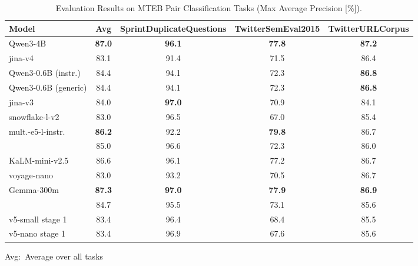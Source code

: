 \documentclass[11pt]{article}
\begin{document}
\begin{table}[H]
\caption{Evaluation Results on MTEB Pair Classification Tasks (Max Average Precision [\%]).}
\label{tab:mteb_pair_classification_en}
\centering
\small
\setlength{\tabcolsep}{4pt}
\begin{tabular}{l*{4}{c}}
\toprule
\textbf{Model} & \textbf{Avg} & \textbf{SprintDuplicateQuestions} & \textbf{TwitterSemEval2015} & \textbf{TwitterURLCorpus} \\
\midrule
Qwen3-4B & \textbf{87.0} & \textbf{96.1} & \textbf{77.8} & \textbf{87.2} \\
jina-v4 & 83.1 & 91.4 & 71.5 & 86.4 \\
\midrule
Qwen3-0.6B (instr.) & 84.4 & 94.1 & 72.3 & \textbf{86.8} \\
Qwen3-0.6B (generic) & 84.4 & 94.1 & 72.3 & \textbf{86.8} \\
jina-v3 & 84.0 & \textbf{97.0} & 70.9 & 84.1 \\
snowflake-l-v2 & 83.0 & 96.5 & 67.0 & 85.4 \\
mult.-e5-l-instr. & \textbf{86.2} & 92.2 & \textbf{79.8} & 86.7 \\
\JEmbeddingVFiveTextSmallShort{} & 85.0 & 96.6 & 72.3 & 86.0 \\
\midrule
KaLM-mini-v2.5 & 86.6 & 96.1 & 77.2 & 86.7 \\
voyage-nano & 83.0 & 93.2 & 70.5 & 86.7 \\
Gemma-300m & \textbf{87.3} & \textbf{97.0} & \textbf{77.9} & \textbf{86.9} \\
\JEmbeddingVFiveTextNanoShort{} & 84.7 & 95.5 & 73.1 & 85.6 \\
\midrule
v5-small stage 1 & 83.4 & 96.4 & 68.4 & 85.5 \\
v5-nano stage 1 & 83.4 & 96.9 & 67.6 & 85.6 \\
\bottomrule
\end{tabular}
\begin{flushleft}
Avg:~Average over  all tasks \\
\end{flushleft}
\end{table}
\end{document}
